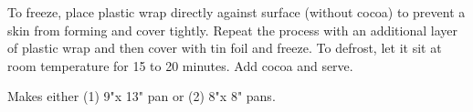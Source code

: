 \begin{recipe}
	\suggestion
	{
		To freeze, place plastic wrap directly against surface (without cocoa) to prevent a skin from forming and cover tightly. Repeat the process with an additional layer of plastic wrap and then cover with tin foil and freeze. To defrost, let it sit at room temperature for 15 to 20 minutes. Add cocoa and serve. 
	}
	
	\hint
	{
		Makes either (1) 9"x 13" pan or (2) 8"x 8" pans. 		
	}

\end{recipe}
